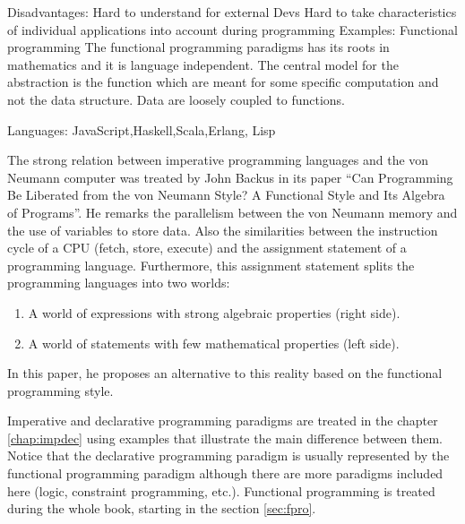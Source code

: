 Disadvantages:
Hard to understand for external Devs
Hard to take characteristics of individual applications into account during programming
Examples:
Functional programming The functional programming paradigms has its roots in mathematics and it is language independent. The central model 
for the abstraction is the function which are meant for some specific computation and not the data structure. Data are loosely coupled to 
functions.

Languages: JavaScript,Haskell,Scala,Erlang, Lisp
 
 
 
 
 
 
 
The strong relation between imperative programming languages and the von Neumann computer was treated by John Backus in its paper ``Can 
Programming Be Liberated from the von Neumann Style? A Functional Style and Its Algebra of Programs''. 
He remarks the parallelism between the von Neumann memory and the use of variables to store data.
Also the similarities between the instruction cycle of a CPU (fetch, store, execute) and the assignment statement of a programming language. 
Furthermore, this assignment statement splits the programming languages into two worlds: 
\begin{enumerate}
    \item A world of expressions with strong algebraic properties (right side).
    \item A world of statements with few mathematical properties (left side).
\end{enumerate} 
In this paper, he proposes an alternative to this reality based on the functional programming style. 

Imperative and declarative programming paradigms are treated in the chapter \ref{chap:impdec} using examples that illustrate the main difference between them. 
Notice that the declarative programming paradigm is usually represented by the functional programming paradigm although there are more paradigms included here (logic, constraint programming, etc.).
Functional programming is treated during the whole book, starting in the section \ref{sec:fpro}.

 

 
 
